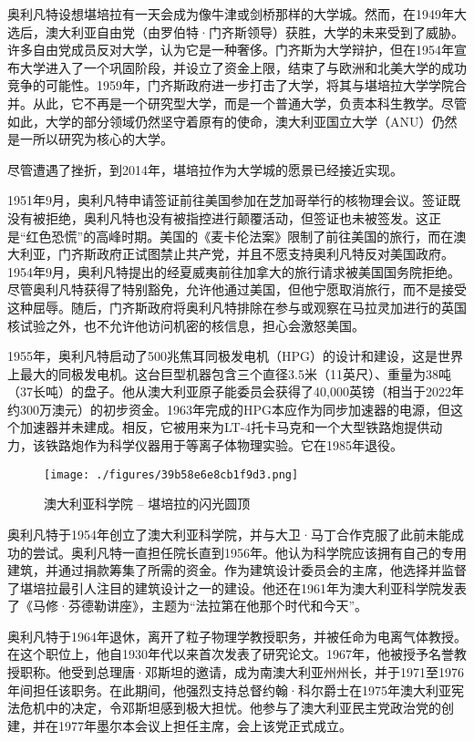 奥利凡特设想堪培拉有一天会成为像牛津或剑桥那样的大学城。然而，在1949年大选后，澳大利亚自由党（由罗伯特·门齐斯领导）获胜，大学的未来受到了威胁。许多自由党成员反对大学，认为它是一种奢侈。门齐斯为大学辩护，但在1954年宣布大学进入了一个巩固阶段，并设立了资金上限，结束了与欧洲和北美大学的成功竞争的可能性。1959年，门齐斯政府进一步打击了大学，将其与堪培拉大学学院合并。从此，它不再是一个研究型大学，而是一个普通大学，负责本科生教学。尽管如此，大学的部分领域仍然坚守着原有的使命，澳大利亚国立大学（ANU）仍然是一所以研究为核心的大学。

尽管遭遇了挫折，到2014年，堪培拉作为大学城的愿景已经接近实现。

1951年9月，奥利凡特申请签证前往美国参加在芝加哥举行的核物理会议。签证既没有被拒绝，奥利凡特也没有被指控进行颠覆活动，但签证也未被签发。这正是“红色恐慌”的高峰时期。美国的《麦卡伦法案》限制了前往美国的旅行，而在澳大利亚，门齐斯政府正试图禁止共产党，并且不愿支持奥利凡特反对美国政府。1954年9月，奥利凡特提出的经夏威夷前往加拿大的旅行请求被美国国务院拒绝。尽管奥利凡特获得了特别豁免，允许他通过美国，但他宁愿取消旅行，而不是接受这种屈辱。随后，门齐斯政府将奥利凡特排除在参与或观察在马拉灵加进行的英国核试验之外，也不允许他访问机密的核信息，担心会激怒美国。

1955年，奥利凡特启动了500兆焦耳同极发电机（HPG）的设计和建设，这是世界上最大的同极发电机。这台巨型机器包含三个直径3.5米（11英尺）、重量为38吨（37长吨）的盘子。他从澳大利亚原子能委员会获得了40,000英镑（相当于2022年约300万澳元）的初步资金。1963年完成的HPG本应作为同步加速器的电源，但这个加速器并未建成。相反，它被用来为LT-4托卡马克和一个大型铁路炮提供动力，该铁路炮作为科学仪器用于等离子体物理实验。它在1985年退役。
\begin{figure}[ht]
\centering
\texttt{[image: ./figures/39b58e6e8cb1f9d3.png]}
\caption{澳大利亚科学院 – 堪培拉的闪光圆顶} \label{fig_MKalft_9}
\end{figure}
奥利凡特于1954年创立了澳大利亚科学院，并与大卫·马丁合作克服了此前未能成功的尝试。奥利凡特一直担任院长直到1956年。他认为科学院应该拥有自己的专用建筑，并通过捐款筹集了所需的资金。作为建筑设计委员会的主席，他选择并监督了堪培拉最引人注目的建筑设计之一的建设。他还在1961年为澳大利亚科学院发表了《马修·芬德勒讲座》，主题为“法拉第在他那个时代和今天”。

奥利凡特于1964年退休，离开了粒子物理学教授职务，并被任命为电离气体教授。在这个职位上，他自1930年代以来首次发表了研究论文。1967年，他被授予名誉教授职称。他受到总理唐·邓斯坦的邀请，成为南澳大利亚州州长，并于1971至1976年间担任该职务。在此期间，他强烈支持总督约翰·科尔爵士在1975年澳大利亚宪法危机中的决定，令邓斯坦感到极大担忧。他参与了澳大利亚民主党政治党的创建，并在1977年墨尔本会议上担任主席，会上该党正式成立。

